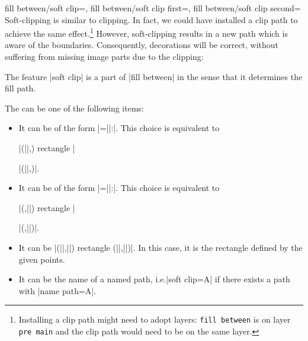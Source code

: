 \begin{tikzkeylist}{%
    fill between/soft clip=,
    fill between/soft clip first=,
    fill between/soft clip second=%
}
    Soft-clipping is similar to clipping. In fact, we could have installed a
    clip path to achieve the same effect.\footnote{Installing a clip path might
    need to adopt layers: \texttt{fill between} is on layer \texttt{pre main}
    and the clip path would need to be on the same layer.} However,
    soft-clipping results in a new path which is aware of the boundaries.
    Consequently, decorations will be correct, without suffering from missing
    image parts due to the clipping:
\begin{codeexample}[]
\end{codeexample}

    The feature |soft clip| is a part of |fill between| in the sense that it
    determines the fill path.

    The  can be one of the following items:
    \begin{itemize}
        \item It can be of the form
            |=||:|. This choice is
            equivalent to

            |(||,) rectangle |

            |(||,)|.
        \item It can be of the form |=||:|. This choice is equivalent to

            |(,||) rectangle |

            |(,||)|.
        \item It can be
            |(||,||) rectangle (||,||)|. In
            this case, it is the rectangle defined by the given points.
        \item It can be the name of a named path, i.e.\@ |soft clip=A| if
            there exists a path with |name path=A|.


\end{itemize}
\end{tikzkeylist}
